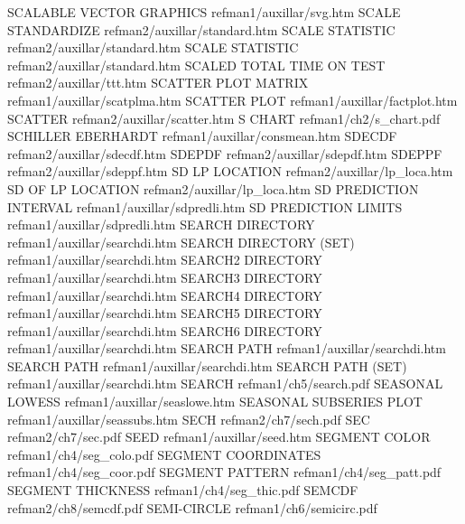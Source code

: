 SCALABLE VECTOR GRAPHICS                refman1/auxillar/svg.htm
SCALE STANDARDIZE                       refman2/auxillar/standard.htm
SCALE STATISTIC                         refman2/auxillar/standard.htm
SCALE STATISTIC                         refman2/auxillar/standard.htm
SCALED TOTAL TIME ON TEST               refman2/auxillar/ttt.htm
SCATTER PLOT MATRIX                     refman1/auxillar/scatplma.htm
SCATTER PLOT                            refman1/auxillar/factplot.htm
SCATTER                                 refman2/auxillar/scatter.htm
S CHART                                 refman1/ch2/s_chart.pdf
SCHILLER EBERHARDT                      refman1/auxillar/consmean.htm
SDECDF                                  refman2/auxillar/sdecdf.htm
SDEPDF                                  refman2/auxillar/sdepdf.htm
SDEPPF                                  refman2/auxillar/sdeppf.htm
SD LP LOCATION                          refman2/auxillar/lp_loca.htm
SD OF LP LOCATION                       refman2/auxillar/lp_loca.htm
SD PREDICTION INTERVAL                  refman1/auxillar/sdpredli.htm
SD PREDICTION LIMITS                    refman1/auxillar/sdpredli.htm
SEARCH DIRECTORY                        refman1/auxillar/searchdi.htm
SEARCH DIRECTORY (SET)                  refman1/auxillar/searchdi.htm
SEARCH2 DIRECTORY                       refman1/auxillar/searchdi.htm
SEARCH3 DIRECTORY                       refman1/auxillar/searchdi.htm
SEARCH4 DIRECTORY                       refman1/auxillar/searchdi.htm
SEARCH5 DIRECTORY                       refman1/auxillar/searchdi.htm
SEARCH6 DIRECTORY                       refman1/auxillar/searchdi.htm
SEARCH PATH                             refman1/auxillar/searchdi.htm
SEARCH PATH                             refman1/auxillar/searchdi.htm
SEARCH PATH (SET)                       refman1/auxillar/searchdi.htm
SEARCH                                  refman1/ch5/search.pdf
SEASONAL LOWESS                         refman1/auxillar/seaslowe.htm
SEASONAL SUBSERIES PLOT                 refman1/auxillar/seassubs.htm
SECH                                    refman2/ch7/sech.pdf
SEC                                     refman2/ch7/sec.pdf
SEED                                    refman1/auxillar/seed.htm
SEGMENT COLOR                           refman1/ch4/seg_colo.pdf
SEGMENT COORDINATES                     refman1/ch4/seg_coor.pdf
SEGMENT PATTERN                         refman1/ch4/seg_patt.pdf
SEGMENT THICKNESS                       refman1/ch4/seg_thic.pdf
SEMCDF                                  refman2/ch8/semcdf.pdf
SEMI-CIRCLE                             refman1/ch6/semicirc.pdf
